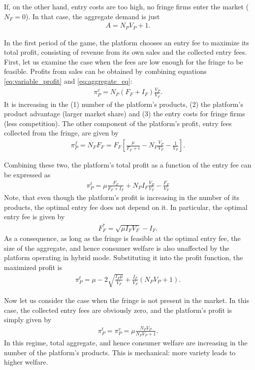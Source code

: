 \documentclass[a4paper]{article}
\begin{document}
If, on the other hand, entry costs are too high, no fringe firms enter the market ($N_F = 0$).
In that case, the aggregate demand is just
\begin{align*}
    A = N_P V_P + 1.
\end{align*}

In the first period of the game, the platform chooses an entry fee to maximize its total profit, consisting of revenue from its own sales and the collected entry fees.
First, let us examine the case when the fees are low enough for the fringe to be feasible.
Profits from sales can be obtained by combining equations \eqref{eq:variable_profit} and \eqref{eq:aggregate_eq}:
\begin{align*}
    \pi_P^{v} = N_P (F_F + I_F) \frac{V_P}{V_F}.
\end{align*}
It is increasing in the (1) number of the platform's products, (2) the platform's product advantage (larger market share) and (3) the entry costs for fringe firms (less competition).
The other component of the platform's profit, entry fees collected from the fringe, are given by
\begin{align*}
    \pi_P^{f} = N_F F_F = F_F \left[ \frac{\mu}{F_F + i} - N_P \frac{V_P}{V_F} - \frac{1}{V_F} \right].
\end{align*}

Combining these two, the platform's total profit as a function of the entry fee can be expressed as
\begin{align}
    \pi_P^{t} = \mu\frac{F_F}{F_F + I_F} + N_P I_F \frac{V_P}{V_F} - \frac{F_F}{V_F}
    \label{eq:hybrid_profit}
\end{align}
Note, that even though the platform's profit is increasing in the number of its products, the optimal entry fee does not depend on it.
In particular, the optimal entry fee is given by
\begin{align*}
    F_F^* = \sqrt{\mu I_F V_F} - I_F.
\end{align*}
As a consequence, as long as the fringe is feasible at the optimal entry fee, the size of the aggregate, and hence consumer welfare is also unaffected by the platform operating in hybrid mode.
Substituting it into the profit function, the maximized profit is
\begin{align*}
    \pi_P^{t} = \mu - 2\sqrt{\frac{I_F \mu}{V_F}} + \frac{I_F}{V_F} (N_P V_P + 1).
\end{align*}

Now let us consider the case when the fringe is not present in the market.
In this case, the collected entry fees are obviously zero, and the platform's profit is simply given by
\begin{align*}
    \pi_P^{t} = \pi_P^{v} = \mu \frac{ N_P V_P}{N_P V_P + 1}.
\end{align*}
In this regime, total aggregate, and hence consumer welfare are increasing in the number of the platform's products.
This is mechanical: more variety leads to higher welfare.
\end{document}
